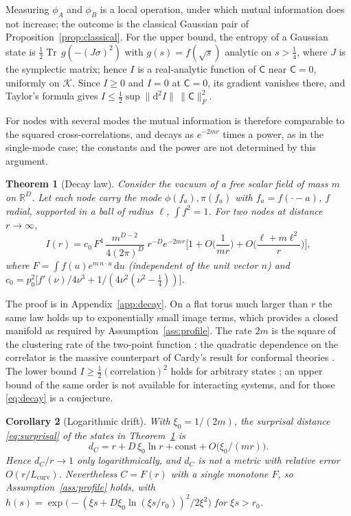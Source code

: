 \documentclass[11pt,a4paper]{article}
\makeatletter
\theoremstyle{stmt}
\newtheorem{theorem}{Theorem}[section]
\newtheorem{corollary}[theorem]{Corollary}
\theoremstyle{defn}
\theoremstyle{rmk}
\renewenvironment{proof}[1][\proofname]{\par\pushQED{\qed}\normalfont\topsep6\p@\@plus6\p@\relax
  \trivlist\item[\hskip\labelsep{\sffamily\itshape\small #1.}]\ignorespaces}{\popQED\endtrivlist\@endpefalse}
\numberwithin{equation}{section}
\DeclareMathOperator{\Tr}{Tr}
\newcommand{\R}{\mathbb{R}}
\newcommand{\dd}{\mathrm{d}}
\newcommand{\Lcurv}{L_{\mathrm{curv}}}
\makeatother
\begin{document}
\begin{proof}
Measuring $\phi_A$ and $\phi_B$ is a local operation, under which mutual information does not increase; the outcome is the classical Gaussian pair of Proposition~\ref{prop:classical}. For the upper bound, the entropy of a Gaussian state is $\tfrac12\Tr\,g(-(J\sigma)^2)$ with $g(s)=f(\sqrt s)$ analytic on $s>\tfrac14$, where $J$ is the symplectic matrix; hence $I$ is a real-analytic function of $\mathsf C$ near $\mathsf C=0$, uniformly on $\mathcal K$. Since $I\ge0$ and $I=0$ at $\mathsf C=0$, its gradient vanishes there, and Taylor's formula gives $I\le\tfrac12\sup\|\dd^2I\|\,\|\mathsf C\|_F^2$.
\end{proof}

For nodes with several modes the mutual information is therefore comparable to the squared cross-correlations, and decays as $e^{-2mr}$ times a power, as in the single-mode case; the constants and the power are not determined by this argument.

\begin{theorem}[Decay law]\label{thm:decay}
Consider the vacuum of a free scalar field of mass $m$ on $\R^D$. Let each node carry the mode $\phi(f_a),\pi(f_a)$ with $f_a=f(\cdot-a)$, $f$ radial, supported in a ball of radius $\ell$, $\int f^2=1$. For two nodes at distance $r\to\infty$,
\begin{equation}\label{eq:decay}
I(r)=c_0\,F^4\,\frac{m^{D-2}}{4(2\pi)^D}\;r^{-D}e^{-2mr}\Big[1+O\Big(\frac1{mr}\Big)+O\Big(\frac{\ell+m\ell^2}{r}\Big)\Big],
\end{equation}
where $F=\int f(u)e^{m\,n\cdot u}\,\dd u$ (independent of the unit vector $n$) and $c_0=p_0^2\big[f'(\nu)/4\nu^3+1/(4\nu^2(\nu^2-\tfrac14))\big]$.
\end{theorem}

The proof is in Appendix~\ref{app:decay}. On a flat torus much larger than $r$ the same law holds up to exponentially small image terms, which provides a closed manifold as required by Assumption~\ref{ass:profile}. The rate $2m$ is the square of the clustering rate of the two-point function \cite{AHR,Fredenhagen,HastingsKoma}; the quadratic dependence on the correlator is the massive counterpart of Cardy's result for conformal theories \cite{Cardy}. The lower bound $I\ge\tfrac12(\text{correlation})^2$ holds for arbitrary states \cite{WVHC}; an upper bound of the same order is not available for interacting systems, and for those \eqref{eq:decay} is a conjecture.

\begin{corollary}[Logarithmic drift]\label{cor:drift}
With $\xi_0=1/(2m)$, the surprisal distance \eqref{eq:surprisal} of the states in Theorem~\ref{thm:decay} is
\begin{equation}
d_C=r+D\,\xi_0\ln r+\mathrm{const}+O\big(\xi_0/(mr)\big).
\end{equation}
Hence $d_C/r\to1$ only logarithmically, and $d_C$ is not a metric with relative error $O(r/\Lcurv)$. Nevertheless $C=F(r)$ with a single monotone $F$, so Assumption~\ref{ass:profile} holds, with $h(s)=\exp\!\big(-(\xi s+D\xi_0\ln(\xi s/r_0))^2/2\xi^2\big)$ for $\xi s>r_0$.
\end{corollary}
\end{document}
